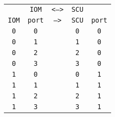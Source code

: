 \begin{adjustwidth}{5ex}{1ex}
	\begin{tabular}{ccccc}
		& \texttt{IOM} & \texttt{<-->} & \texttt{SCU} &  \\
		\texttt{IOM} & \texttt{port} & \texttt{-->} & \texttt{SCU} & \texttt{port} \\
		\texttt{0} & \texttt{0} & & \texttt{0} & \texttt{0} \\
		\texttt{0} & \texttt{1} & & \texttt{1} & \texttt{0} \\
		\texttt{0} & \texttt{2} & & \texttt{2} & \texttt{0} \\
		\texttt{0} & \texttt{3} & & \texttt{3} & \texttt{0} \\
		\texttt{1} & \texttt{0} & & \texttt{0} & \texttt{1} \\
		\texttt{1} & \texttt{1} & & \texttt{1} & \texttt{1} \\
		\texttt{1} & \texttt{2} & & \texttt{2} & \texttt{1} \\
		\texttt{1} & \texttt{3} & & \texttt{3} & \texttt{1} \\
	\end{tabular}
\end{adjustwidth}

